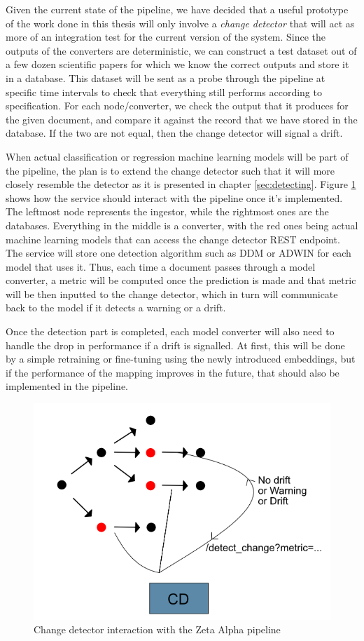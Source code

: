 \documentclass[12pt]{extreport}
\begin{document}
Given the current state of the pipeline, we have decided that a useful prototype of the work done in this thesis will only involve a \emph{change detector} that will act as more of an integration test for the current version of the system. Since the outputs of the converters are deterministic, we can construct a test dataset out of a few dozen scientific papers for which we know the correct outputs and store it in a database. This dataset will be sent as a probe through the pipeline at specific time intervals to check that everything still performs according to specification. For each node/converter, we check the output that it produces for the given document, and compare it against the record that we have stored in the database. If the two are not equal, then the change detector will signal a drift.

When actual classification or regression machine learning models will be part of the pipeline, the plan is to extend the change detector such that it will more closely resemble the detector as it is presented in chapter \ref{sec:detecting}. Figure \ref{fig:prototype} shows how the service should interact with the pipeline once it's implemented. The leftmost node represents the ingestor, while the rightmost ones are the databases. Everything in the middle is a converter, with the red ones being actual machine learning models that can access the change detector REST endpoint. The service will store one detection algorithm such as DDM or ADWIN for each model that uses it. Thus, each time a document passes through a model converter, a metric will be computed once the prediction is made and that metric will be then inputted to the change detector, which in turn will communicate back to the model if it detects a warning or a drift.

Once the detection part is completed, each model converter will also need to handle the drop in performance if a drift is signalled. At first, this will be done by a simple retraining or fine-tuning using the newly introduced embeddings, but if the performance of the mapping improves in the future, that should also be implemented in the pipeline.

\begin{figure}[H]
\centering
\includegraphics[width=0.9\linewidth]{assets/prototype/prototype.png}
\caption{Change detector interaction with the Zeta Alpha pipeline}
\label{fig:prototype}
\end{figure}
\end{document}
